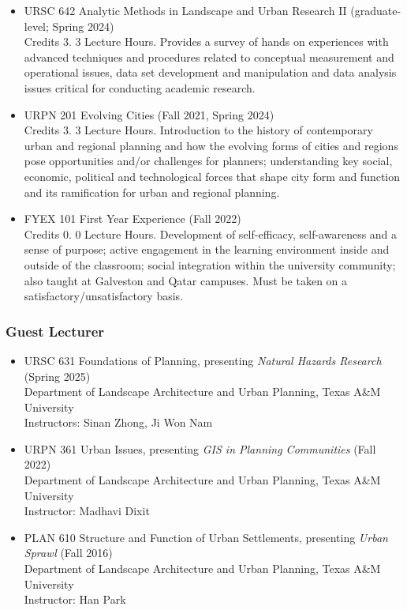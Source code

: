 \documentclass[11pt,oneside]{article}
\begin{document}
\begin{itemize}[leftmargin=40pt, label={-}]
\item {\frutigerregular URSC 642 Analytic Methods in Landscape and Urban Research II} (graduate-level; Spring 2024)\\
      Credits 3. 3 Lecture Hours. Provides a survey of hands on experiences with advanced techniques and procedures related to conceptual measurement and operational issues, data set development and manipulation and data analysis issues critical for conducting academic research.
\item {\frutigerregular URPN 201 Evolving Cities} (Fall 2021, Spring 2024)\\
      Credits 3. 3 Lecture Hours. Introduction to the history of contemporary urban and regional planning and how the evolving forms of cities and regions pose opportunities and/or challenges for planners; understanding key social, economic, political and technological forces that shape city form and function and its ramification for urban and regional planning.
\item {\frutigerregular FYEX 101 First Year Experience} (Fall 2022)\\
      Credits 0. 0 Lecture Hours. Development of self-efficacy, self-awareness and a sense of purpose; active engagement in the learning environment inside and outside of the classroom; social integration within the university community; also taught at Galveston and Qatar campuses. Must be taken on a satisfactory/unsatisfactory basis.
\end{itemize}

\subsubsection{Guest Lecturer}
\begin{itemize}[leftmargin=40pt, label={-}]
\item {\frutigerregular URSC 631 Foundations of Planning}, presenting \emph{Natural Hazards Research} (Spring 2025)\\
      {Department of Landscape Architecture and Urban Planning, Texas A\&M University}\\
      Instructors: Sinan Zhong, Ji Won Nam
\item {\frutigerregular URPN 361 Urban Issues}, presenting \emph{GIS in Planning Communities} (Fall 2022)\\
      {Department of Landscape Architecture and Urban Planning, Texas A\&M University}\\
      Instructor: Madhavi Dixit
\item {\frutigerregular PLAN 610 Structure and Function of Urban Settlements}, presenting \emph{Urban Sprawl} (Fall 2016)\\
      {Department of Landscape Architecture and Urban Planning, Texas A\&M University}\\
      Instructor: Han Park
\end{itemize}
\end{document}

